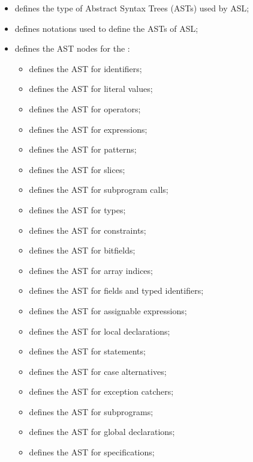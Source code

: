 \ChapterOutline
\begin{itemize}
  \item {} defines the type of Abstract Syntax Trees (ASTs) used by ASL;
  \item {} defines notations used to define the ASTs of ASL;
  \item {} defines the AST nodes for the \untypedast:
  \begin{itemize}
    \item {} defines the AST for identifiers;
    \item {} defines the AST for literal values;
    \item {} defines the AST for operators;
    \item {} defines the AST for expressions;
    \item {} defines the AST for patterns;
    \item {} defines the AST for slices;
    \item {} defines the AST for subprogram calls;
    \item {} defines the AST for types;
    \item {} defines the AST for constraints;
    \item {} defines the AST for bitfields;
    \item {} defines the AST for array indices;
    \item {} defines the AST for fields and typed identifiers;
    \item {} defines the AST for assignable expressions;
    \item {} defines the AST for local declarations;
    \item {} defines the AST for statements;
    \item {} defines the AST for case alternatives;
    \item {} defines the AST for exception catchers;
    \item {} defines the AST for subprograms;
    \item {} defines the AST for global declarations;
    \item {} defines the AST for specifications;

\end{itemize}
\end{itemize}
